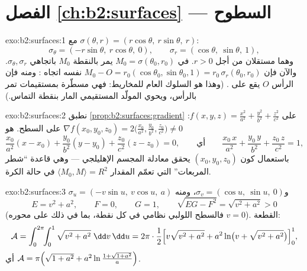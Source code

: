 \section*{الفصل \ref{ch:b2:surfaces} --- السطوح}

\begin{solution}{exo:b2:surfaces:1}
مع $\sigma(\theta, r) = (r\cos\theta,\ r\sin\theta,\ r)$:
\[
\sigma_\theta = (-r\sin\theta,\ r\cos\theta,\ 0),
\qquad
\sigma_r = (\cos\theta,\ \sin\theta,\ 1),
\]
وهما مستقلان من أجل $r > 0$.  في $M_0 =
\sigma(\theta_0, r_0)$ يمر بالنقطة $M_0$
باتجاهي $\sigma_\theta, \sigma_r$. والآن فإن $M_0 - O = r_0(\cos\theta_0,
\sin\theta_0, 1) = r_0\,\sigma_r(\theta_0, r_0)$ نفسه اتجاه : ومنه فإن الرأس $O$
يقع على . (وهذا هو السلوك العام للمخاريط: فهي مسطّرة
بمستقيمات تمر بالرأس، ويحوي  المولّد المستقيمي المار
بنقطة التماس.)
\end{solution}

\begin{solution}{exo:b2:surfaces:2}
نطبق \cref{prop:b2:surfaces:gradient} على $f(x,y,z) =
\frac{x^2}{a^2} + \frac{y^2}{b^2} + \frac{z^2}{c^2}$: $\nabla
f(x_0,y_0,z_0) = 2\bigl(\frac{x_0}{a^2}, \frac{y_0}{b^2},
\frac{z_0}{c^2}\bigr) \neq 0$ على السطح.  هو
\[
\frac{x_0}{a^2}(x - x_0) + \frac{y_0}{b^2}(y - y_0)
+ \frac{z_0}{c^2}(z - z_0) = 0,
\qquad\text{أي}\qquad
\frac{x_0\,x}{a^2} + \frac{y_0\,y}{b^2} + \frac{z_0\,z}{c^2} = 1,
\]
باستعمال كون $(x_0, y_0, z_0)$ يحقق معادلة المجسم الإهليلجي --- وهي قاعدة ``شطر
المربعات'' التي تعمّم المقدار $\langle
M_0, M \rangle = R^2$ في حالة الكرة.
\end{solution}

\begin{solution}{exo:b2:surfaces:3}
$\sigma_u = (-v\sin u,\ v\cos u,\ a)$ و$\sigma_v = (\cos u,\
\sin u,\ 0)$، ومنه
\[
E = v^2 + a^2, \qquad F = 0, \qquad G = 1,
\qquad
\sqrt{EG - F^2} = \sqrt{v^2 + a^2} > 0
\]
(فالسطح اللولبي نظامي في كل نقطة، بما في ذلك على محوره $v =
0$).
 القطعة:
\[
\mathcal{A} = \int_0^{2\pi}\!\!\int_0^1
\sqrt{v^2 + a^2}\;\dd v\,\dd u
= 2\pi\cdot\frac12\Bigl[v\sqrt{v^2 + a^2}
+ a^2\ln\bigl(v + \sqrt{v^2 + a^2}\bigr)\Bigr]_0^1 ,
\]
أي $\mathcal{A} = \pi\Bigl(\sqrt{1 + a^2} +
a^2\ln\frac{1 + \sqrt{1 + a^2}}{a}\Bigr)$.
\end{solution}

